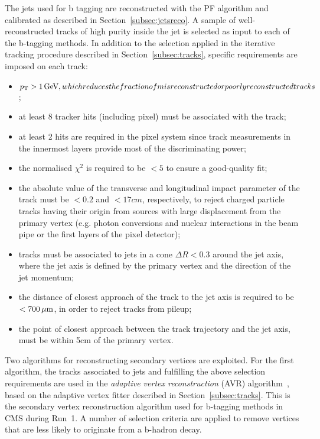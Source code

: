 The jets used for b tagging are reconstructed with the PF algorithm and calibrated as described in Section~\ref{subsec:jetsreco}. A sample of well-reconstructed tracks of high purity inside the jet is selected as input to each of the b-tagging methods. In addition to the selection applied in the iterative tracking procedure described in Section~\ref{subsec:tracks}, specific requirements are imposed on each track:

\begin{itemize}
\item $p_{\mathrm{T}} >1\,\text{Ge\hspace{-.08em}V}, which reduces the  fraction of misreconstructed or poorly reconstructed tracks$;
\item at least 8 tracker hits (including pixel) must be associated with the track;
\item at least 2 hits are required in the pixel system since track measurements in the innermost layers provide most of the discriminating power;
\item the normalised $\chi^2$ is required to be $< 5$ to ensure a good-quality fit;
\item the absolute value of the transverse and longitudinal impact parameter of the track must be $< 0.2$ and $< 17\unit{cm}$, respectively, to reject charged particle tracks having their origin from sources with large displacement from the primary vertex (e.g. photon conversions and nuclear interactions in the beam pipe or the first layers of the pixel detector);
\item tracks must be associated to jets in a cone $\Delta R < 0.3$ around the jet axis, where the jet axis is defined by the primary vertex and the direction of the jet momentum;
\item the distance of closest approach of the track to the jet axis is required to be $< 700\,\mu\text{m}$, in order to reject tracks from pileup;
\item the point of closest approach between the track trajectory and the jet axis, must be within 5\unit{cm} of the primary vertex.
\end{itemize}

Two algorithms for reconstructing secondary vertices are exploited. For the first algorithm, the tracks associated to jets and fulfilling the above selection requirements are used in the \textit{adaptive vertex reconstruction} (AVR) algorithm~\cite{Waltenberger:1166320}, based on the adaptive vertex fitter described in Section~\ref{subsec:tracks}. This is the secondary vertex reconstruction algorithm used for b-tagging methods in CMS during Run~1. A number of selection criteria are applied to remove vertices that are less likely to originate from a b-hadron decay. 

